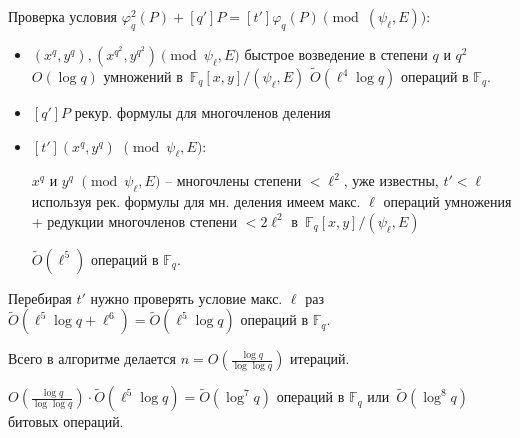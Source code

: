 \documentclass{beamer}
\begin{document}
\begin{frame}
Проверка условия $\varphi_q^2(P) + [q'] P = [t']\varphi_q(P) \pmod{(\psi_\ell, E)}$:
\begin{itemize}
    \item $(x^q, y^q), (x^{q^2}, y^{q^2}) \pmod{\psi_\ell, E} $ \MyImplies
    быстрое возведение в степени $q$ и $q^2$
    \MyImplies
    $O(\log{q})$ умножений в~$\mathbb{F}_q[x, y] / (\psi_\ell, E)$
    \MyImplies
    $\widetilde{O}(\ell^4 \log{q})$ операций в $\mathbb{F}_q$.
    
    
    \vspace{0.5em}
    \item $[q'] P$ \MyImplies рекур. формулы для многочленов деления%
    
    \vspace{0.5em}
    \item $[t'](x^q, y^q)$ $\pmod{\psi_\ell, E}$:
    
    $x^q$ и $y^q$ $\pmod{\psi_\ell, E}$ -- многочлены степени $< \ell^2$, уже известны, $t' < \ell$
    \MyImplies
    используя рек. формулы для мн. деления имеем макс. $\ell$ операций умножения + редукции многочленов степени $< 2 \ell^2$ в~$\mathbb{F}_q[x, y] / (\psi_\ell, E)$
    
    \MyImplies
    $\widetilde{O}(\ell^5)$ операций в $\mathbb{F}_q$.
\end{itemize}
\end{frame}

\begin{frame}
Перебирая $t'$ нужно проверять условие макс. $\ell$ раз
\MyImplies
$\widetilde{O}(\ell^5 \log{q} + \ell^6) = \widetilde{O}(\ell^5 \log{q})$ операций в $\mathbb{F}_q$.

\vspace{1em}
Всего в алгоритме делается $n = O(\frac{\log{q}}{\log{\log{q}}})$ итераций.

\vspace{1em}
$O(\frac{\log{q}}{\log{\log{q}}}) \cdot \widetilde{O}(\ell^5 \log{q}) = \widetilde{O}(\log^7{q})$ операций в $\mathbb{F}_q$ или~$\widetilde{O}(\log^8{q})$ битовых операций.

\end{frame}
\end{document}

